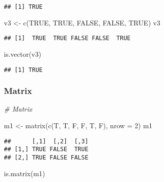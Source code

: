 \documentclass[
]{article}
\newenvironment{Shaded}{\begin{snugshade}}{\end{snugshade}}
\newcommand{\AttributeTok}[1]{\textcolor[rgb]{0.77,0.63,0.00}{#1}}
\newcommand{\CommentTok}[1]{\textcolor[rgb]{0.56,0.35,0.01}{\textit{#1}}}
\newcommand{\ConstantTok}[1]{\textcolor[rgb]{0.00,0.00,0.00}{#1}}
\newcommand{\DecValTok}[1]{\textcolor[rgb]{0.00,0.00,0.81}{#1}}
\newcommand{\FunctionTok}[1]{\textcolor[rgb]{0.00,0.00,0.00}{#1}}
\newcommand{\NormalTok}[1]{#1}
\newcommand{\OtherTok}[1]{\textcolor[rgb]{0.56,0.35,0.01}{#1}}
\begin{document}
\begin{verbatim}
## [1] TRUE
\end{verbatim}

\begin{Shaded}
\begin{Highlighting}[]
\NormalTok{v3 }\OtherTok{\textless{}{-}} \FunctionTok{c}\NormalTok{(}\ConstantTok{TRUE}\NormalTok{, }\ConstantTok{TRUE}\NormalTok{, }\ConstantTok{FALSE}\NormalTok{, }\ConstantTok{FALSE}\NormalTok{, }\ConstantTok{TRUE}\NormalTok{)}
\NormalTok{v3}
\end{Highlighting}
\end{Shaded}

\begin{verbatim}
## [1]  TRUE  TRUE FALSE FALSE  TRUE
\end{verbatim}

\begin{Shaded}
\begin{Highlighting}[]
\FunctionTok{is.vector}\NormalTok{(v3)}
\end{Highlighting}
\end{Shaded}

\begin{verbatim}
## [1] TRUE
\end{verbatim}

\hypertarget{matrix}{%
\subsubsection{Matrix}\label{matrix}}

\begin{Shaded}
\begin{Highlighting}[]
\CommentTok{\# Matrix}

\NormalTok{m1 }\OtherTok{\textless{}{-}} \FunctionTok{matrix}\NormalTok{(}\FunctionTok{c}\NormalTok{(T, T, F, F, T, F), }\AttributeTok{nrow =} \DecValTok{2}\NormalTok{)}
\NormalTok{m1}
\end{Highlighting}
\end{Shaded}

\begin{verbatim}
##      [,1]  [,2]  [,3]
## [1,] TRUE FALSE  TRUE
## [2,] TRUE FALSE FALSE
\end{verbatim}

\begin{Shaded}
\begin{Highlighting}[]
\FunctionTok{is.matrix}\NormalTok{(m1)}
\end{Highlighting}
\end{Shaded}
\end{document}
